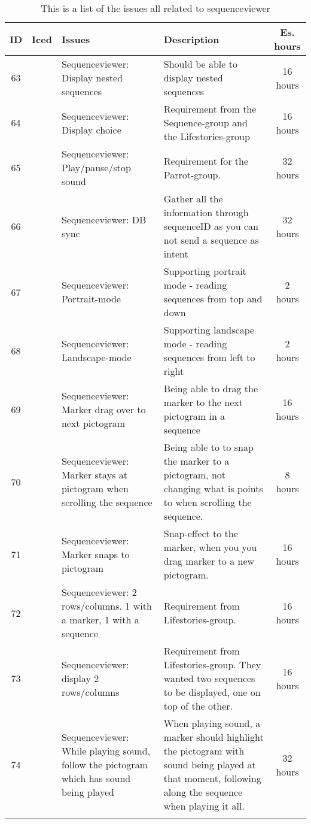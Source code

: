 \begin{longtable} { | c | c | p{5cm} | p{5cm} | c | } 
\hline
	ID 	& Iced	&	Issues	&	Description		&	 Es. hours \\\hline
	63	& 		& 	Sequenceviewer: Display nested sequences	&	Should be able to display nested sequences		& 	16 hours \\\hline
	64	& 		&   Sequenceviewer: Display choice	&	Requirement from the Sequence-group and the Lifestories-group	& 	16 hours  \\\hline
	65	& 		& 	Sequenceviewer: Play/pause/stop sound	&	Requirement for the Parrot-group.	& 	32 hours  \\\hline
	66	& 		& 	Sequenceviewer: DB sync	&	Gather all the information through sequenceID as you can not send a sequence as intent			 &  32 hours \\\hline
	67	& 		& 	Sequenceviewer: Portrait-mode	&	Supporting portrait mode - reading sequences from top and down	&   2 hours \\\hline
	68	&		& 	Sequenceviewer: Landscape-mode	&	Supporting landscape mode - reading sequences from left to right		& 		   2 hours \\\hline
	69	& 		& 	Sequenceviewer: Marker drag over to next pictogram	&	Being able to drag the marker to the next pictogram in a sequence	& 	16 hours	   \\\hline
	70	& 		& 	Sequenceviewer: Marker stays at pictogram when scrolling the sequence	&	Being able to to snap the marker to a pictogram, not changing what is points to when scrolling the sequence.		& 	8 hours	   \\\hline
	71	& 		& 	Sequenceviewer: Marker snaps to pictogram	&	Snap-effect to the marker, when you you drag marker to a new pictogram.	& 		16 hours   \\\hline
	72	& 		& 	Sequenceviewer: 2 rows/columns. 1 with a marker, 1 with a sequence	&	Requirement from Lifestories-group.	& 	16 hours	   \\\hline
	73	& 		& 	Sequenceviewer: display 2 rows/columns	&	Requirement from Lifestories-group. They wanted two sequences to be displayed, one on top of the other.	& 	16 hours	   \\\hline
	74	& 		& 	Sequenceviewer: While playing sound, follow the pictogram which has sound being played	&	When playing sound, a marker should highlight the pictogram with sound being played at that moment, following along the sequence when playing it all.	& 		32 hours   \\\hline
\caption{This is a list of the issues all related to sequenceviewer}
\label{tab:spr4_sw_prodblog}
\end{longtable}

